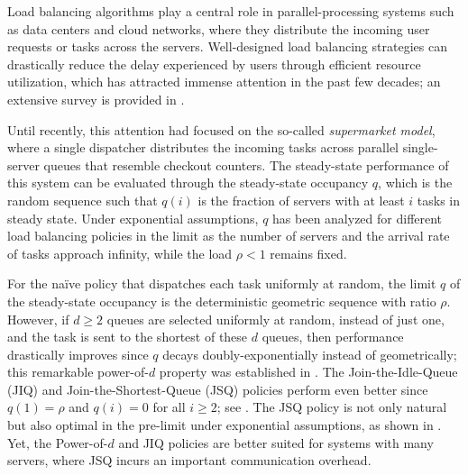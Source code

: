 \documentclass[a4paper, 12pt]{article}
\theoremstyle{definition}
\begin{document}
Load balancing algorithms play a central role in parallel-processing systems such as data centers and cloud networks, where they distribute the incoming user requests or tasks across the servers. Well-designed load balancing strategies can drastically reduce the delay experienced by users through efficient resource utilization, which has attracted immense attention in the past few decades;  an extensive survey is provided in \cite{van2018scalable}.

Until recently, this attention had focused on the so-called \emph{supermarket model}, where a single dispatcher distributes the incoming tasks across parallel single-server queues that resemble checkout counters. The steady-state performance of this system can be evaluated through the steady-state occupancy $q$, which is the random sequence such that $q(i)$ is the fraction of servers with at least $i$ tasks in steady state. Under exponential assumptions, $q$ has been analyzed for different load balancing policies in the limit as the number of servers and the arrival rate of tasks approach infinity, while the load $\rho < 1$ remains fixed.

For the na\"{i}ve policy that dispatches each task uniformly at random, the limit $q$ of the steady-state occupancy is the deterministic geometric sequence with ratio $\rho$. However, if $d \geq 2$ queues are selected uniformly at random, instead of just one, and the task is sent to the shortest of these $d$ queues, then performance drastically improves since $q$ decays doubly-exponentially instead of geometrically; this remarkable power-of-$d$ property was established in \cite{vvedenskaya1996queueing,mitzenmacher2001power}. The Join-the-Idle-Queue (JIQ) and Join-the-Shortest-Queue (JSQ) policies perform even better since $q(1) = \rho$ and $q(i) = 0$ for all $i \geq 2$; see \cite{lu2011join,stolyar2015pull,mukherjee2018universality}. The JSQ policy is not only natural but also optimal in the pre-limit under exponential assumptions, as shown in \cite{menich1991optimality,sparaggis1993extremal}. Yet, the Power-of-$d$ and JIQ policies are better suited for systems with many servers, where JSQ incurs an important communication overhead.
\end{document}
